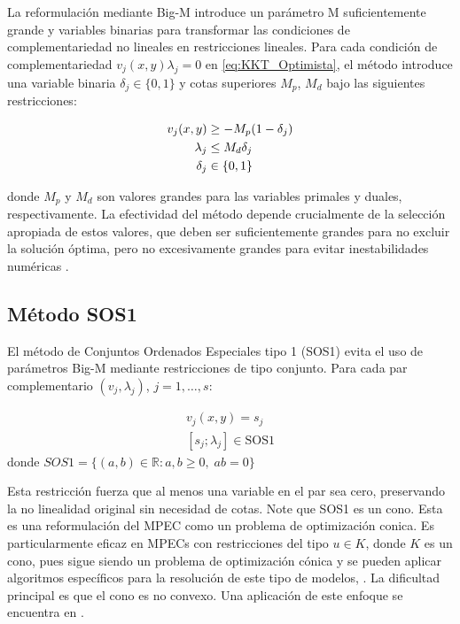 La reformulación mediante Big-M introduce un parámetro M suficientemente grande y variables binarias para transformar las condiciones de complementariedad no lineales en restricciones lineales. Para cada condición de complementariedad 
$v_j(x,y)\lambda_j = 0$ en \eqref{eq:KKT_Optimista}, el método introduce una variable binaria  $\delta_j \in \{0,1\}$ y cotas superiores $M_p$, $M_d$ bajo  las siguientes restricciones:

\begin{align}
    v_j(x,y) &\geq -M_p(1 - \delta_j) \notag \\
    \lambda_j &\leq M_d \delta_j \\
    \delta_j &\in \{0,1\} \notag
\end{align}

donde $M_p$ y $M_d$ son valores grandes para las variables primales y duales, respectivamente. La efectividad del método depende crucialmente de la selección apropiada de estos valores, que deben ser suficientemente grandes para no excluir la solución óptima, pero no excesivamente grandes para evitar inestabilidades numéricas \cite{BilevelJump}.


\subsection{Método SOS1}

El método de Conjuntos Ordenados Especiales tipo 1 (SOS1) evita el uso de parámetros Big-M mediante restricciones de tipo conjunto. Para cada par complementario $(v_j, \lambda_j)$, $j=1,\ldots, s$:

\begin{equation}\label{eq:SOS1_reform}\begin{matrix}v_j(x,y)=s_j\\
[s_j; \lambda_j] \in \text{SOS1} \end{matrix}
\end{equation}
 donde $SOS1=\{(a,b)\in \mathbb{R}: a,b\geq 0,\; ab=0\}$


Esta restricción fuerza que al menos una variable en el par sea cero, preservando la no linealidad original sin necesidad de cotas. Note que SOS1 es un cono. Esta es una reformulación del  MPEC como un problema de optimización conica. Es particularmente eficaz en MPECs con restricciones del tipo $u\in K$, donde $K$ es un cono, pues sigue siendo un problema de optimización cónica  y se pueden aplicar algoritmos específicos para la resolución de este tipo de modelos, \cite{BilevelJump}. La dificultad principal es que el cono es no convexo. Una aplicación de este enfoque se encuentra en \cite{SadddiquiNaturalGasSOS1}.


